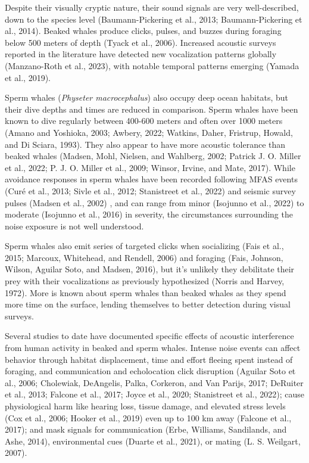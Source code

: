 \documentclass[
]{article}
\begin{document}
Despite their visually cryptic nature, their sound signals are very
well-described, down to the species level (Baumann-Pickering et al.,
2013; Baumann-Pickering et al., 2014). Beaked whales produce clicks,
pulses, and buzzes during foraging below 500 meters of depth (Tyack et
al., 2006). Increased acoustic surveys reported in the literature have
detected new vocalization patterns globally (Manzano-Roth et al., 2023),
with notable temporal patterns emerging (Yamada et al., 2019).

Sperm whales (\emph{Physeter macrocephalus}) also occupy deep ocean
habitats, but their dive depths and times are reduced in comparison.
Sperm whales have been known to dive regularly between 400-600 meters
and often over 1000 meters (Amano and Yoshioka, 2003; Awbery, 2022;
Watkins, Daher, Fristrup, Howald, and Di Sciara, 1993). They also appear
to have more acoustic tolerance than beaked whales (Madsen, Mohl,
Nielsen, and Wahlberg, 2002; Patrick J. O. Miller et al., 2022; P. J. O.
Miller et al., 2009; Winsor, Irvine, and Mate, 2017). While avoidance
responses in sperm whales have been recorded following MFAS events (Curé
et al., 2013; Sivle et al., 2012; Stanistreet et al., 2022) and seismic
survey pulses (Madsen et al., 2002) , and can range from minor (Isojunno
et al., 2022) to moderate (Isojunno et al., 2016) in severity, the
circumstances surrounding the noise exposure is not well understood.

Sperm whales also emit series of targeted clicks when socializing (Fais
et al., 2015; Marcoux, Whitehead, and Rendell, 2006) and foraging (Fais,
Johnson, Wilson, Aguilar Soto, and Madsen, 2016), but it's unlikely they
debilitate their prey with their vocalizations as previously
hypothesized (Norris and Harvey, 1972). More is known about sperm whales
than beaked whales as they spend more time on the surface, lending
themselves to better detection during visual surveys.

Several studies to date have documented specific effects of acoustic
interference from human activity in beaked and sperm whales. Intense
noise events can affect behavior through habitat displacement, time and
effort fleeing spent instead of foraging, and communication and
echolocation click disruption (Aguilar Soto et al., 2006; Cholewiak,
DeAngelis, Palka, Corkeron, and Van Parijs, 2017; DeRuiter et al., 2013;
Falcone et al., 2017; Joyce et al., 2020; Stanistreet et al., 2022);
cause physiological harm like hearing loss, tissue damage, and elevated
stress levels (Cox et al., 2006; Hooker et al., 2019) even up to 100 km
away (Falcone et al., 2017); and mask signals for communication (Erbe,
Williams, Sandilands, and Ashe, 2014), environmental cues (Duarte et
al., 2021), or mating (L. S. Weilgart, 2007).
\end{document}
